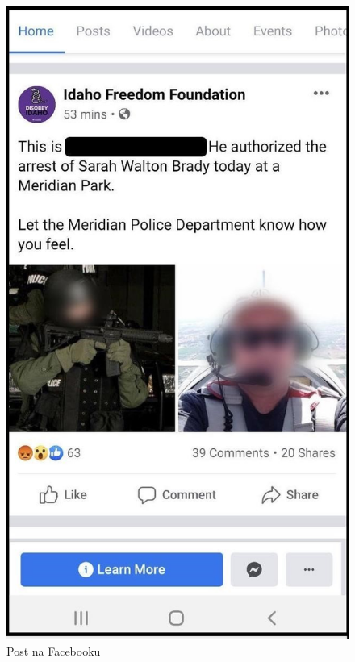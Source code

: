 \begin{figure}[H]
  \centering
  \includegraphics[width=1\textwidth]{images/officer.jpg}
  \caption{Post na Facebooku}
  \label{fig:officer}
\end{figure} 

